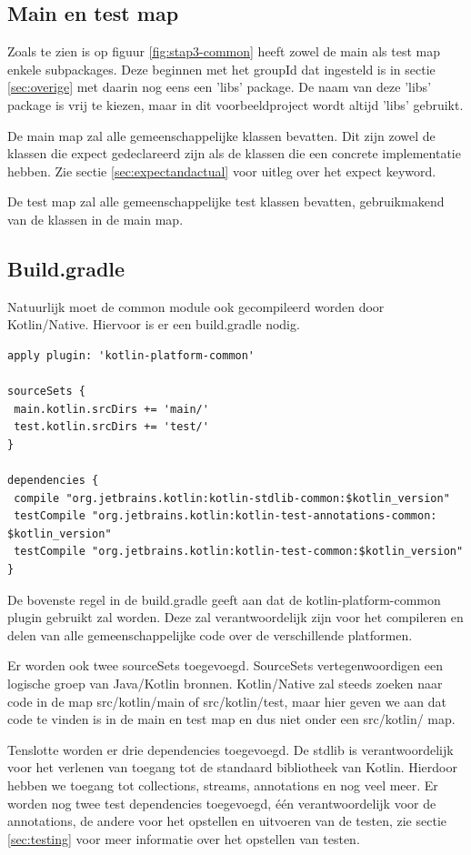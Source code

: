 \subsection{Main en test map}
\label{sec:maintestcommon}
Zoals te zien is op figuur \ref{fig:stap3-common} heeft zowel de main als test map enkele subpackages. Deze beginnen met het groupId dat ingesteld is in sectie \ref{sec:overige} met daarin nog eens een 'libs' package. De naam van deze 'libs' package is vrij te kiezen, maar in dit voorbeeldproject wordt altijd 'libs' gebruikt.

De main map zal alle gemeenschappelijke klassen bevatten. Dit zijn zowel de klassen die expect gedeclareerd zijn als de klassen die een concrete implementatie hebben. Zie sectie \ref{sec:expectandactual} voor uitleg over het expect keyword.

De test map zal alle gemeenschappelijke test klassen bevatten, gebruikmakend van de klassen in de main map.

\subsection{Build.gradle}
\label{sec:gradlecommon}
Natuurlijk moet de common module ook gecompileerd worden door Kotlin/Native. Hiervoor is er een build.gradle nodig.

\begin{lstlisting}
apply plugin: 'kotlin-platform-common'

sourceSets {
 main.kotlin.srcDirs += 'main/'
 test.kotlin.srcDirs += 'test/'
}

dependencies {
 compile "org.jetbrains.kotlin:kotlin-stdlib-common:$kotlin_version"
 testCompile "org.jetbrains.kotlin:kotlin-test-annotations-common: $kotlin_version"
 testCompile "org.jetbrains.kotlin:kotlin-test-common:$kotlin_version"
}
\end{lstlisting}
De bovenste regel in de build.gradle geeft aan dat de kotlin-platform-common plugin gebruikt zal worden. Deze zal verantwoordelijk zijn voor het compileren en delen van alle gemeenschappelijke code over de verschillende platformen.

Er worden ook twee sourceSets toegevoegd. SourceSets vertegenwoordigen een logische groep van Java/Kotlin bronnen. Kotlin/Native zal steeds zoeken naar code in de map src/kotlin/main of src/kotlin/test, maar hier geven we aan dat code te vinden is in de main en test map en dus niet onder een src/kotlin/ map.

Tenslotte worden er drie dependencies toegevoegd. De stdlib is verantwoordelijk voor het verlenen van toegang tot de standaard bibliotheek van Kotlin. Hierdoor hebben we toegang tot collections, streams, annotations en nog veel meer. Er worden nog twee test dependencies toegevoegd, één verantwoordelijk voor de annotations, de andere voor het opstellen en uitvoeren van de testen, zie sectie \ref{sec:testing} voor meer informatie over het opstellen van testen.

